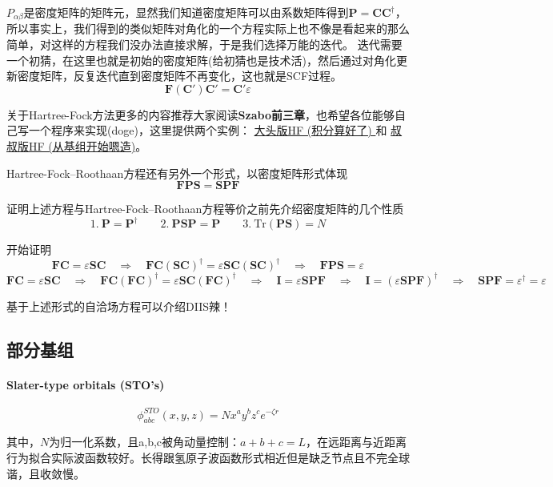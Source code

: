 $P_{\alpha\beta}$是密度矩阵的矩阵元，显然我们知道密度矩阵可以由系数矩阵得到$\mathbf{P}=\mathbf{C}\mathbf{C}^{\dagger}$，所以事实上，我们得到的类似矩阵对角化的一个方程实际上也不像是看起来的那么简单，对这样的方程我们没办法直接求解，于是我们选择万能的迭代。
迭代需要一个初猜，在这里也就是初始的密度矩阵(给初猜也是技术活)，然后通过对角化更新密度矩阵，反复迭代直到密度矩阵不再变化，这也就是SCF过程。
\[\mathbf{F}(\mathbf{C}')\mathbf{C}'=\mathbf{C}'\varepsilon\]

关于Hartree-Fock方法更多的内容推荐大家阅读\textbf{Szabo前三章}，也希望各位能够自己写一个程序来实现(doge)，这里提供两个实例：
\href{https://github.com/yangdatou/hf-tutorial}{大头版HF (积分算好了) }和
\href{https://github.com/Walter-Feng/Hartree-Fock-in-CPP}{叔叔版HF (从基组开始嗯造)}。

Hartree-Fock–Roothaan方程还有另外一个形式，以密度矩阵形式体现
\[\mathbf{F}\mathbf{P}\mathbf{S}=\mathbf{S}\mathbf{P}\mathbf{F}\]

证明上述方程与Hartree-Fock–Roothaan方程等价之前先介绍密度矩阵的几个性质
\[1. \ \mathbf{P}=\mathbf{P}^{\dagger} \qquad 2. \ \mathbf{P}\mathbf{S}\mathbf{P}=\mathbf{P} \qquad 3.\ \text{Tr}(\mathbf{P}\mathbf{S})=N\]

开始证明
\[\mathbf{F}\mathbf{C}=\varepsilon\mathbf{S}\mathbf{C} \quad \Rightarrow \quad \mathbf{F}\mathbf{C}(\mathbf{S}\mathbf{C})^{\dagger}=\varepsilon\mathbf{S}\mathbf{C}(\mathbf{S}\mathbf{C})^{\dagger} \quad \Rightarrow \quad \mathbf{F}\mathbf{P}\mathbf{S}=\varepsilon\]
\[\mathbf{F}\mathbf{C}=\varepsilon\mathbf{S}\mathbf{C} \quad \Rightarrow \quad \mathbf{F}\mathbf{C}(\mathbf{F}\mathbf{C})^{\dagger}=\varepsilon\mathbf{S}\mathbf{C}(\mathbf{F}\mathbf{C})^{\dagger} \quad \Rightarrow \quad \mathbf{I}=\varepsilon\mathbf{S}\mathbf{P}\mathbf{F} \quad \Rightarrow \quad \mathbf{I}=(\varepsilon\mathbf{S}\mathbf{P}\mathbf{F})^{\dagger} \quad \Rightarrow \quad \mathbf{S}\mathbf{P}\mathbf{F}=\varepsilon^{\dagger}=\varepsilon\]

基于上述形式的自洽场方程可以介绍DIIS辣！


\subsection{部分基组}
\paragraph*{Slater-type orbitals (STO's)}
\[\phi_{abc}^{STO}(x,y,z)=Nx^ay^bz^ce^{-\zeta r}\]

其中，$N$为归一化系数，且a,b,c被角动量控制：$a+b+c=L$，在远距离与近距离行为拟合实际波函数较好。长得跟氢原子波函数形式相近但是缺乏节点且不完全球谐，且收敛慢。

